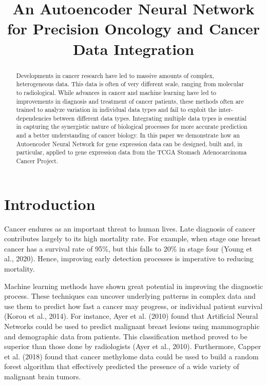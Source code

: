 \documentclass{article}
\title{An Autoencoder Neural Network for Precision Oncology and Cancer Data Integration}
\begin{document}
\maketitle


\begin{abstract}
  Developments in cancer research have led to massive amounts of complex, heterogeneous data. This data is often of very different scale, ranging from molecular to radiological. While advances in cancer and machine learning have led to improvements in diagnosis and treatment of cancer patients, these methods often are trained to analyze variation in individual data types and fail to exploit the inter-dependencies between different data types. Integrating multiple data types is essential in capturing the synergistic nature of biological processes for more accurate prediction and a better understanding of cancer biology. In this paper we demonstrate how an Autoencoder Neural Network for gene expression data can be designed, built and, in particular, applied to gene expression data from the TCGA Stomach Adenocarcinoma Cancer Project.

\end{abstract}

\newpage
\section{Introduction}

Cancer endures as an important threat to human lives. Late diagnosis of cancer contributes largely to its high mortality rate. For example, when stage one breast cancer has a survival rate of 95\%, but this falls to 20\% in stage four (Young et al., 2020). Hence, improving early detection processes is imperative to reducing mortality.

Machine learning methods have shown great potential in improving the diagnostic process. These techniques can uncover underlying patterns in complex data and use them to predict how fast a cancer may progress, or individual patient survival (Korou et al., 2014). For instance, Ayer et al. (2010) found that Artificial Neural Networks could be used to predict malignant breast lesions using mammographic and demographic data from patients. This classification method proved to be superior than those done by radiologists (Ayer et al., 2010). Furthermore, Capper et al. (2018) found that cancer methylome data could be used to build a random forest algorithm that effectively predicted the presence of a wide variety of malignant brain tumors.
\end{document}
